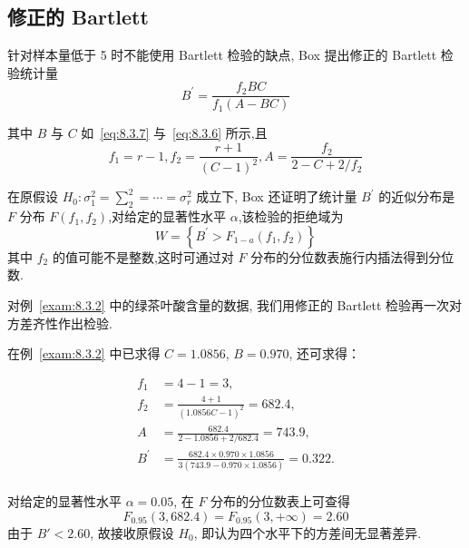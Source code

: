 \subsection{修正的 Bartlett}

针对样本量低于 5 时不能使用 Bartlett 检验的缺点, Box 提出修正的 Bartlett 检验统计量
\begin{equation}\label{eq:8.3.9}
  B^{\prime}=\frac{f_{2} B C}{f_{1}(A-B C)}
\end{equation}

其中 $B$ 与 $C$ 如~\eqref{eq:8.3.7} 与~\eqref{eq:8.3.6} 所示,且
\begin{equation*}
  f_{1}=r-1, f_{2}=\frac{r+1}{(C-1)^{2}}, A=\frac{f_{2}}{2-C+2 / f_{2}}
\end{equation*}

在原假设 $H_0: \sigma^2_1 = \sum_2^2 = \cdots = \sigma^2_r$ 成立下, Box 还证明了统计量 $B^{\prime}$ 的近似分布是 $F$ 分布 $F(f_1,f_2)$,对给定的显著性水平 $\alpha$,该检验的拒绝域为
\begin{equation}\label{eq:8.3.10}
  W=\left\{B^{\prime}>F_{1-a}\left(f_{1}, f_{2}\right)\right\}
\end{equation}
其中 $f_2$ 的值可能不是整数,这时可通过对 $F$ 分布的分位数表施行内插法得到分位数.

\begin{example}\label{exam:8.3.3}
  对例~\ref{exam:8.3.2} 中的绿茶叶酸含量的数据, 我们用修正的 Bartlett 检验再一次对方差齐性作出检验.
\end{example}


在例~\ref{exam:8.3.2} 中已求得 $C = 1.0856$, $B = 0.970$, 还可求得：

\begin{align*}
  f_1 & = 4 - 1 = 3,\\
  f_2 & = \frac{4 + 1}{(1.0856 C -1)^2} = 682.4, \\
  A   & = \frac{682.4}{2 - 1.0856 + 2/682.4} = 743.9, \\
  B^{'} & = \frac{682.4 \times 0.970 \times 1.0856}{3(743.9 - 0.970 \times 1.0856)} = 0.322.\\
\end{align*}

对给定的显著性水平 $\alpha = 0.05$, 在 $F$ 分布的分位数表上可查得
\begin{equation}
  F_{0.95}(3,682.4) = F_{0.95}(3, +\infty) = 2.60
\end{equation}
由于 $B' < 2.60$, 故接收原假设 $H_{0}$, 即认为四个水平下的方差间无显著差异.

